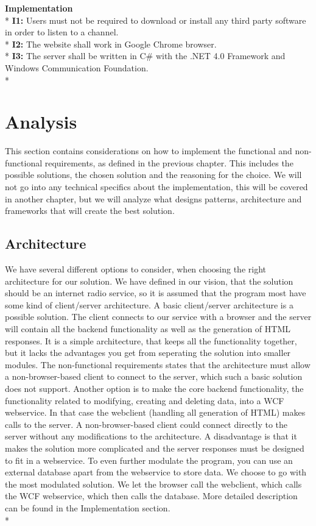 \documentclass[a4paper,11pt,report]{article}
\begin{document}
\textbf{Implementation} \\*
\textbf{I1:} Users must not be required to download or install any third party software in order to listen to a channel. \\*
\textbf{I2:} The website shall work in Google Chrome browser. \\*
\textbf{I3:} The server shall be written in C\# with the .NET 4.0 Framework and Windows Communication Foundation. \\*

\section{Analysis}
This section contains considerations on how to implement the functional and non-functional requirements, as defined in the previous chapter. This includes the possible solutions, the chosen solution and the reasoning for the choice. We will not go into any technical specifics about the implementation, this will be covered in another chapter, but we will analyze what designs patterns, architecture and frameworks that will create the best solution. 

\subsection{Architecture}
We have several different options to consider, when choosing the right architecture for our solution. We have defined in our vision, that the solution should be an internet radio service, so it is assumed that the program most have some kind of client/server architecture. A basic client/server architecture is a possible solution. The client connects to our service with a browser and the server will contain all the backend functionality as well as the generation of HTML responses. It is a simple architecture, that keeps all the functionality together, but it lacks the advantages you get from seperating the solution into smaller modules. The non-functional requirements states that the architecture must allow a non-browser-based client to connect to the server, which such a basic solution does not support. Another option is to make the core backend functionality, the functionality related to modifying, creating and deleting data, into a WCF webservice. In that case the webclient (handling all generation of HTML) makes calls to the server. A non-browser-based client could connect directly to the server without any modifications to the architecture. A disadvantage is that it makes the solution more complicated and the server responses must be designed to fit in a webservice. To even further modulate the program, you can use an external database apart from the webservice to store data. We choose to go with the most modulated solution. We let the browser call the webclient, which calls the WCF webservice, which then calls the database. More detailed description can be found in the Implementation section. \\*
\end{document}
